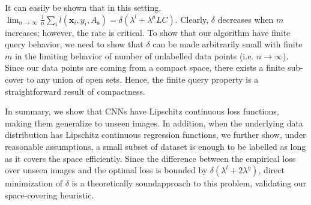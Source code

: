 It can easily be shown that in this setting, $\lim_{n \rightarrow \infty} \frac{1}{n}\sum_i l(\mathbf{x}_i,y_i,A_\mathbf{s}) =    \delta (\lambda^l + \lambda^\mu LC)$. Clearly, $\delta$ decreases when $m$ increases; however, the rate is critical. To show that our algorithm have finite query behavior, we need to show that $\delta$ can be made arbitrarily small with finite $m$ in the limiting behavior of number of unlabelled data points (i.e. $n \rightarrow \infty$). Since our data points are coming from a compact space, there exists a finite sub-cover to any union of open sets. Hence, the finite query property is a straightforward result of compactness. %

\iffalse
\begin{cor}
Given $n$ i.i.d. samples drawn from $p_\mathcal{Z}$ as $\{\mathbf{x}_i,y_i\}_{i\in[n]}$, and a desired error rate $\rho$. If loss function $l(\cdot,y,\mathbf{w})$ is $\lambda^l$-Lipschitz continuous for all $y, \mathbf{w}$, regression function is $\lambda^\eta$-Lipschitz, there exist a finite subset $\mathbf{s}$ with cardinality m such that any CNN achieving $0$ error over $\{\mathbf{x}_{s(j)},y_{s(j)}\}_{j \in [m]}$ achieve the following with probability $1$.
\[
\lim_{n \rightarrow \infty} \frac{1}{n}\sum_i l(\mathbf{x}_i,y_i) \leq \rho %
\]
\label{maincor}
\end{cor}
\fi

In summary, we show that CNNs have Lipschitz continuous loss functions, making them generalize to unseen images. In addition, when the underlying data distribution has Lipschitz continuous regression functions, we further show, under reasonable assumptions, a small subset of dataset is enough to be labelled as long as it covers the space efficiently. Since the difference between the empirical loss over unseen images and the optimal loss is bounded by $\delta(\lambda^l + 2 \lambda^{\eta})$, direct minimization of $\delta$ is a theoretically soundapproach to this problem, validating our space-covering heuristic.
